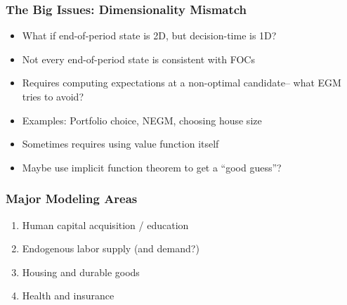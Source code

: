 \documentclass[11pt]{beamer}
\newcommand{\bi}{\begin{itemize}}
\newcommand{\ei}{\end{itemize}}
\begin{document}
\begin{frame}
\frametitle{The Big Issues: Dimensionality Mismatch}

\bi
\item <1->What if end-of-period state is 2D, but decision-time is 1D?

\item <1->Not every end-of-period state is consistent with FOCs

\item <2->Requires computing expectations at a non-optimal candidate-- what EGM tries to avoid?

\item <2->Examples: Portfolio choice, NEGM, choosing house size

\item <3->Sometimes requires using value function itself

\item <3->Maybe use implicit function theorem to get a ``good guess''?
\ei
\end{frame}


\begin{frame}
\frametitle{Major Modeling Areas}

\begin{enumerate}
\item Human capital acquisition / education
	
\item Endogenous labor supply (and demand?)

\item Housing and durable goods

\item Health and insurance
\end{enumerate}

\end{frame}
\end{document}

